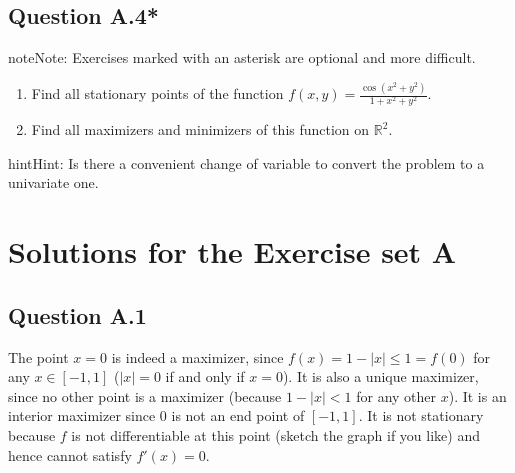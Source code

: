 \documentclass[letterpaper,10pt,english]{jupyterBook}
\begin{document}
\section{Question A.4*}
\label{\detokenize{02.exercises:question-a-4}}
\begin{sphinxadmonition}{note}{Note:}
\sphinxAtStartPar
Exercises marked with an asterisk \sphinxstylestrong{(*)} are optional and more difficult.
\end{sphinxadmonition}
\begin{enumerate}
%
\item {} 
\sphinxAtStartPar
Find all stationary points of the function
\(f(x, y) = \frac{\cos(x^2 + y^2)}{1 + x^2 + y^2}\).

\item {} 
\sphinxAtStartPar
Find all maximizers and minimizers of this function on \(\mathbb{R}^2\).

\end{enumerate}

\begin{sphinxadmonition}{hint}{Hint:}
\sphinxAtStartPar
Is there a convenient change of variable to convert the problem to a univariate one.
\end{sphinxadmonition}

\sphinxstepscope


\chapter{Solutions for the Exercise set A}
\label{\detokenize{02.exercises_solutions:solutions-for-the-exercise-set-a}}\label{\detokenize{02.exercises_solutions::doc}}

\section{Question A.1}
\label{\detokenize{02.exercises_solutions:question-a-1}}
\sphinxAtStartPar
The point \(x=0\) is indeed a maximizer, since \(f(x) = 1 -|x| \leq 1 = f(0)\) for any \(x \in [-1, 1]\) (\(|x|=0\) if and only if \(x=0\)).
It is also a unique maximizer, since no other point is a maximizer (because \(1 -|x| < 1\) for any other \(x\)).
It is an interior maximizer since \(0\) is not an end point of \([-1, 1]\).
It is not stationary because \(f\) is not differentiable at this point (sketch the graph if you like) and hence cannot satisfy \(f'(x)=0\).
\end{document}
